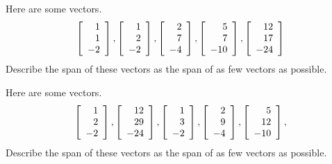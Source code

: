 \begin{enumialphparenastyle}

\begin{ex} Here are some vectors. 
\begin{equation*}
\left[ 
\begin{array}{r}
1 \\ 
1 \\ 
-2
\end{array}
\right] ,\left[ 
\begin{array}{r}
1 \\ 
2 \\ 
-2
\end{array}
\right] ,\left[ 
\begin{array}{r}
2 \\ 
7 \\ 
-4
\end{array}
\right] ,\left[ 
\begin{array}{r}
5 \\ 
7 \\ 
-10
\end{array}
\right] ,\left[ 
\begin{array}{r}
12 \\ 
17 \\ 
-24
\end{array}
\right]
\end{equation*}
Describe the span of these vectors as the span of as few vectors as possible.
\end{ex}

\begin{ex} Here are some vectors. 
\begin{equation*}
\left[ 
\begin{array}{r}
1 \\ 
2 \\ 
-2
\end{array}
\right] ,\left[ 
\begin{array}{r}
12 \\ 
29 \\ 
-24
\end{array}
\right] ,\left[ 
\begin{array}{r}
1 \\ 
3 \\ 
-2
\end{array}
\right] ,\left[ 
\begin{array}{r}
2 \\ 
9 \\ 
-4
\end{array}
\right] ,\left[ 
\begin{array}{r}
5 \\ 
12 \\ 
-10
\end{array}
\right] ,
\end{equation*}
Describe the span of these vectors as the span of as few vectors as possible.
\end{ex}


\end{enumialphparenastyle}
